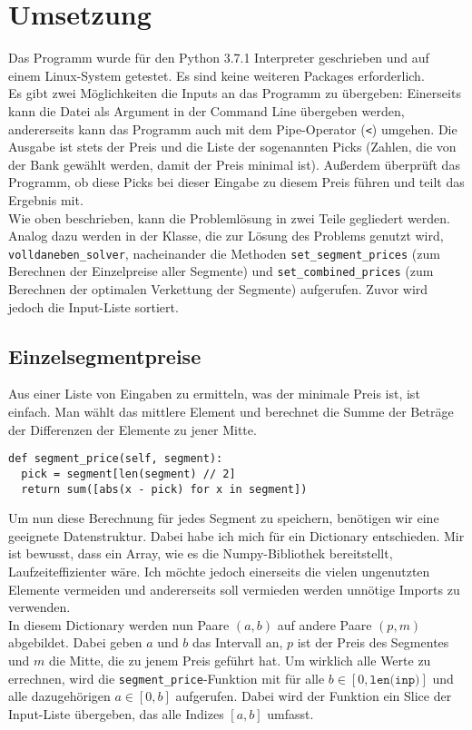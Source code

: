 \documentclass[a4paper,10pt,ngerman]{scrartcl}
\begin{document}
\section{Umsetzung}
Das Programm wurde f\"ur den Python 3.7.1 Interpreter geschrieben und
auf einem Linux-System getestet. Es sind keine weiteren Packages erforderlich.\\
\indent Es gibt zwei M\"oglichkeiten die Inputs an das Programm zu \"ubergeben:
Einerseits kann die Datei als Argument in der Command Line \"ubergeben
werden, andererseits kann das Programm auch mit dem Pipe-Operator 
(\texttt{<}) umgehen. Die Ausgabe ist stets der Preis und die Liste der
sogenannten Picks (Zahlen, die von der Bank gew\"ahlt werden, damit der Preis
minimal ist). Au\ss erdem \"uberpr\"uft das Programm, ob diese Picks bei dieser
Eingabe zu diesem Preis f\"uhren und teilt das Ergebnis mit.\\
\indent Wie oben beschrieben, kann die Probleml\"osung in zwei Teile gegliedert
werden. Analog dazu werden in der Klasse, die zur L\"osung des Problems genutzt
wird, \texttt{volldaneben\_solver}, nacheinander die Methoden
\texttt{set\_segment\_prices} (zum Berechnen der Einzelpreise aller Segmente)
und \texttt{set\_combined\_prices} (zum Berechnen der optimalen Verkettung
der Segmente) aufgerufen. Zuvor wird jedoch die Input-Liste sortiert.
\subsection{Einzelsegmentpreise}
Aus einer Liste von Eingaben zu ermitteln, was der minimale Preis ist, ist
einfach. Man w\"ahlt das mittlere Element und berechnet die Summe der 
Betr\"age der Differenzen der Elemente zu jener Mitte.
\begin{lstlisting}
def segment_price(self, segment):                                            
  pick = segment[len(segment) // 2]                                           
  return sum([abs(x - pick) for x in segment])                               
\end{lstlisting}
Um nun diese Berechnung f\"ur jedes Segment zu speichern, ben\"otigen
wir eine geeignete Datenstruktur. Dabei habe ich mich f\"ur ein Dictionary
entschieden. Mir ist bewusst, dass ein Array, wie es die Numpy-Bibliothek
bereitstellt, Laufzeiteffizienter w\"are. Ich m\"ochte jedoch einerseits
die vielen ungenutzten Elemente vermeiden und andererseits soll vermieden
werden unn\"otige Imports zu verwenden.\\
\indent In diesem Dictionary werden nun Paare $(a, b)$ auf andere Paare
$(p, m)$ abgebildet. Dabei geben $a$ und $b$ das Intervall an, $p$
ist der Preis des Segmentes und $m$ die Mitte, die zu jenem Preis gef\"uhrt
hat. Um wirklich alle Werte zu errechnen, wird die 
\texttt{segment\_price}-Funktion mit f\"ur alle $b\in[0, \texttt{len(inp)}]$
und alle dazugeh\"origen $a\in[0, b]$ aufgerufen. Dabei wird der Funktion
ein Slice der Input-Liste \"ubergeben, das alle Indizes $[a, b]$ umfasst.
\end{document}
